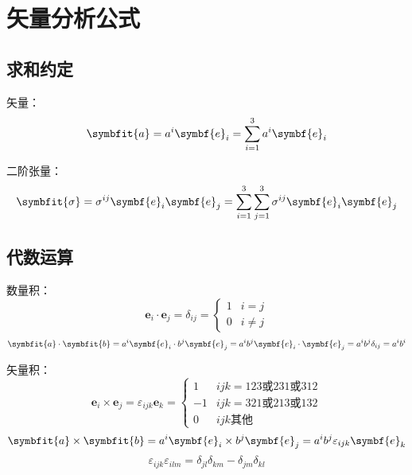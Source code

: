 \chapter{矢量分析公式}\label{vector}

\section{求和约定}
矢量：
\begin{equation}
\symbfit{a} = a^i \symbf{e}_i = \sum_{i=1}^{3} a^i \symbf{e}_i
\end{equation}

二阶张量：
\begin{equation}
\symbfit{\sigma} = \sigma^{ij} \symbf{e}_i \symbf{e}_j = \sum_{i=1}^{3}\sum_{j=1}^{3}  \sigma^{ij} \symbf{e}_i \symbf{e}_j
\end{equation}

\section{代数运算}
数量积：
\begin{equation}
\symbf{e}_i \cdot\symbf{e}_j = \delta_{ij} =
    \begin{cases}
    1 & i=j \\
    0 & i\neq j
    \end{cases}
\end{equation}
%
\begin{equation}
\symbfit{a} \cdot \symbfit{b}
=
a^i \symbf{e}_i \cdot b^j \symbf{e}_j
=
a^i b^j \symbf{e}_i \cdot\symbf{e}_j
= a^i b^j \delta_{ij}
= a^i b^i
\end{equation}

矢量积：
\begin{equation}
\symbf{e}_i \times\symbf{e}_j = \varepsilon_{ijk}\symbf{e}_k =
    \begin{cases}
    1 & ijk=123\text{或}231\text{或}312 \\
    -1 & ijk=321\text{或}213\text{或}132 \\
    0 & ijk\text{其他}
    \end{cases}
\end{equation}
%
\begin{equation}
\symbfit{a} \times \symbfit{b}
=
a^i \symbf{e}_i \times b^j \symbf{e}_j
=
a^i b^j  \varepsilon_{ijk}\symbf{e}_k
\end{equation}
%
\begin{equation}
\varepsilon_{ijk} \varepsilon_{ilm} =
\delta_{jl}\delta_{km} - \delta_{jm}\delta_{kl}
\end{equation}
%
